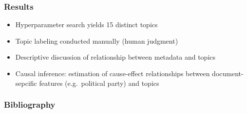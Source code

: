 \documentclass[xcolor=dvipsnames]{beamer}
\begin{document}
\begin{frame}
\frametitle{Results}
\begin{itemize}
\item Hyperparameter search yields 15 distinct topics
\item Topic labeling conducted manually (human judgment)
\item Descriptive discussion of relationship between metadata and topics
\item Causal inference: estimation of cause-effect relationships between document-sepcific features (e.g.\ political party) and topics
\end{itemize}
\end{frame}

\begin{frame}
\frametitle{Bibliography}
\printbibliography
\end{frame}
\end{document}
